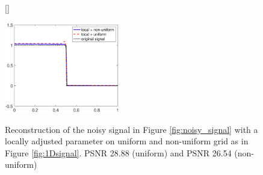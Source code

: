 \documentclass[enabledeprecatedfontcommands,cleardoublepage=empty,headsepline,twoside,11pt,DIV=15,BCOR=12mm,final]{scrartcl}
\begin{document}
\begin{figure}[b]
\begin{center}
[\FBwidth]
{\caption{Reconstruction of the noisy signal in Figure \ref{fig:noisy_signal} with a locally adjusted parameter on uniform and non-uniform grid as in Figure \ref{fig:1Dsignal}. PSNR 28.88 (uniform) and PSNR 26.54 (non-uniform)}\label{fig:PSNR}}
{\includegraphics[width=5cm]{Comparison_uniform_nonuniform_mesh_average}}
\end{center}
\end{figure}
\end{document}
